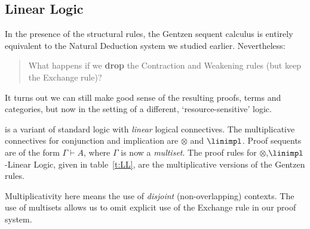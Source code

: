 \documentclass[12pt]{article}
\begin{document}
\subsection{Linear Logic}
In the presence of the structural rules, the Gentzen sequent calculus is entirely equivalent to the Natural Deduction system we studied earlier.
Nevertheless:
\begin{quote}
What happens if we \textbf{drop} the Contraction and Weakening rules (but keep the Exchange rule)?
\end{quote}
It turns out we can still make good sense of the resulting proofs, terms and categories, but now in the setting of a different, `resource-sensitive'
logic.

\begin{mydefinition}
 is a variant of standard logic with \emph{linear} logical connectives. The multiplicative connectives for
conjunction and implication are $\otimes$ and $\linimpl$. {Proof sequents} are of the form $\Gamma \vdash A$, where $\Gamma$ is now a \emph{multiset}.
The proof rules for $\otimes$,$\linimpl$-Linear Logic, given in table~\ref{t:LL}, are the multiplicative versions of the Gentzen rules.
\deq\end{mydefinition}
\begin{center}
\renewcommand{\arraystretch}{.5}
\label{t:LL}
\end{center}
%
Multiplicativity here means the use of \emph{disjoint} (\ie non-overlapping) contexts.
The use of multisets allows us to omit explicit use of the Exchange rule in our proof system.
\end{document}
